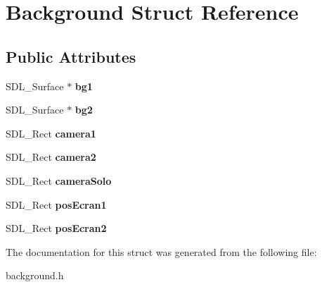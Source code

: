 \hypertarget{structBackground}{}\section{Background Struct Reference}
\label{structBackground}
\subsection*{Public Attributes}
\begin{DoxyCompactItemize}
\item 
\mbox{\label{structBackground_a7e2ff64dc25f84e6be445bbfffd0217e}} 
S\+D\+L\+\_\+\+Surface $\ast$ {\bfseries bg1}
\item 
\mbox{\label{structBackground_a1a5ed8c454159592cce738937e90970b}} 
S\+D\+L\+\_\+\+Surface $\ast$ {\bfseries bg2}
\item 
\mbox{\label{structBackground_a10213a83c3d22a8b8617f202758a6001}} 
S\+D\+L\+\_\+\+Rect {\bfseries camera1}
\item 
\mbox{\label{structBackground_a4d756b04725d0079bd2b7647a684b652}} 
S\+D\+L\+\_\+\+Rect {\bfseries camera2}
\item 
\mbox{\label{structBackground_a55a1f4f519ef08adfb861f259d4770e8}} 
S\+D\+L\+\_\+\+Rect {\bfseries camera\+Solo}
\item 
\mbox{\label{structBackground_a50c75fc3176420a9941167b6b2a30dcd}} 
S\+D\+L\+\_\+\+Rect {\bfseries pos\+Ecran1}
\item 
\mbox{\label{structBackground_a0446f53696f1a9b0fc466de5683f335d}} 
S\+D\+L\+\_\+\+Rect {\bfseries pos\+Ecran2}
\end{DoxyCompactItemize}


The documentation for this struct was generated from the following file\+:\begin{DoxyCompactItemize}
\item 
background.\+h\end{DoxyCompactItemize}
